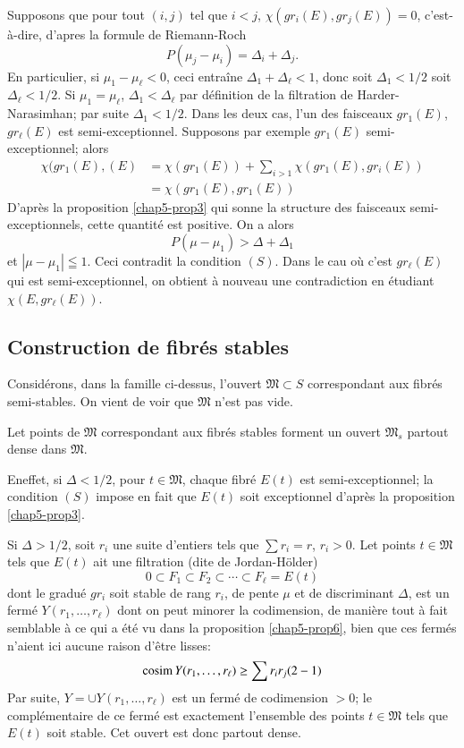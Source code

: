 Supposons que pour tout $(i,j)$ tel que $i<j$,
$\chi(gr_{i}(E),gr_{j}(E))=0$, c'est-\`a-dire, d'apres la formule de
Riemann-Roch 
$$
P(\mu_{j}-\mu_{i})=\Delta_{i}+\Delta_{j}.
$$\pageoriginale
En particulier, si $\mu_{1}-\mu_{\ell}<0$, ceci entra\^ine
$\Delta_{1}+\Delta_{\ell}<1$, donc soit $\Delta_{1}<1/2$ soit
$\Delta_{\ell}<1/2$. Si $\mu_{1}=\mu_{\ell}$,
$\Delta_{1}<\Delta_{\ell}$ par d\'efinition de la filtration de
Harder-Narasimhan; par suite $\Delta_{1}<1/2$. Dans les deux cas, l'un
des faisceaux $gr_{1}(E)$, $gr_{\ell}(E)$ est
semi-exceptionnel. Supposons par exemple $gr_{1}(E)$
semi-exceptionnel; alors
\begin{align*}
\chi(gr_{1}(E),(E)
&= \chi(gr_{1}(E))+\sum_{i>1}\chi(gr_{1}(E),gr_{i}(E))\\[3pt]
&= \chi(gr_{1}(E),gr_{1}(E))
\end{align*}
D'apr\`es la proposition \ref{chap5-prop3} qui sonne la structure des
faisceaux semi-excep\-tionnels, cette quantit\'e est positive. On a
alors 
$$
P(\mu-\mu_{1})>\Delta+\Delta_{1}
$$
et $|\mu-\mu_{1}|\leqq 1$. Ceci contradit la condition $(S)$. Dans le
cau o\`u c'est $gr_{\ell}(E)$ qui est semi-exceptionnel, on
obtient \`a nouveau une contradiction en \'etudiant
$\chi(E,gr_{\ell}(E))$. 

\subsection{Construction de fibr\'es stables}\label{chap5-sec7.4}

Consid\'erons, dans la famille ci-dessus, l'ouvert
$\mathfrak{M}\subset S$ correspondant aux fibr\'es semi-stables. On
vient de voir que $\mathfrak{M}$ n'est pas vide.

\begin{lemma}\label{chap5-lem3}
Let points de $\mathfrak{M}$ correspondant aux fibr\'es stables
forment un ouvert $\mathfrak{M}_{s}$ partout dense dans
$\mathfrak{M}$. 
\end{lemma}

En\pageoriginale effet, si $\Delta<1/2$, pour $t\in \mathfrak{M}$,
chaque fibr\'e 
$E(t)$ est semi-exceptionnel; la condition $(S)$ impose en fait que
$E(t)$ soit exceptionnel d'apr\`es la proposition \ref{chap5-prop3}.

Si $\Delta>1/2$, soit $r_{i}$ une suite d'entiers tels que $\sum
r_{i}=r$, $r_{i}>0$. Let points $t\in \mathfrak{M}$ tels que $E(t)$
ait une filtration (dite de Jordan-H\"older)
$$
0\subset F_{1}\subset F_{2}\subset \cdots\subset F_{\ell}=E(t)
$$
dont le gradu\'e $gr_{i}$ soit stable de rang $r_{i}$, de pente $\mu$
et de discriminant $\Delta$, est un ferm\'e $Y(r_{1},\ldots,r_{\ell})$
dont on peut minorer la codimension, de mani\`ere tout \`a fait
semblable \`a ce qui a \'et\'e vu dans la
proposition \ref{chap5-prop6}, bien que ces ferm\'es n'aient ici
aucune raison d'\^etre lisses:
$$
\operatorname{cosim} Y (r_{1},\ldots,r_{\ell})\geq \sum r_{i}r_{j}(2-1)
$$
Par suite, $Y=\cup Y(r_{1},\ldots,r_{\ell})$ est un ferm\'e de
codimension $>0$; le compl\'ementaire de ce ferm\'e est exactement
l'ensemble des points $t\in \mathfrak{M}$ tels que $E(t)$ soit
stable. Cet ouvert est donc partout dense.

